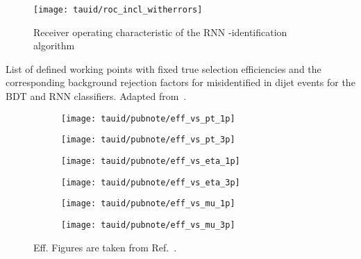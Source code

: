 \begin{figure}[htbp]
  \centering

  \texttt{[image: tauid/roc\_incl\_witherrors]}

  \caption{Receiver operating characteristic of the RNN
    \tauhad-identification algorithm \cite{ATL-PHYS-PUB-2019-033}}%
  \label{fig:tauid_rnn_bdt_roc_comparison}
\end{figure}


\begin{table}
  \centering

  \caption{List of defined working points with fixed true \tauhadvis
    selection efficiencies and the corresponding background rejection
    factors for misidentified \tauhadvis in dijet events for the BDT
    and RNN classifiers. Adapted from~\cite{ATL-PHYS-PUB-2019-033}.}%
  \label{tab:rnn_wps}

  
\end{table}


\begin{figure}[htbp]

  \begin{subfigure}{0.498\textwidth}
    \texttt{[image: tauid/pubnote/eff\_vs\_pt\_1p]}
    \subcaption{}
  \end{subfigure}\hfill%
  \begin{subfigure}{0.498\textwidth}
    \texttt{[image: tauid/pubnote/eff\_vs\_pt\_3p]}
    \subcaption{}
  \end{subfigure}

  \begin{subfigure}{0.498\textwidth}
    \texttt{[image: tauid/pubnote/eff\_vs\_eta\_1p]}
    \subcaption{}
  \end{subfigure}\hfill%
  \begin{subfigure}{0.498\textwidth}
    \texttt{[image: tauid/pubnote/eff\_vs\_eta\_3p]}
    \subcaption{}
  \end{subfigure}

  \begin{subfigure}{0.498\textwidth}
    \texttt{[image: tauid/pubnote/eff\_vs\_mu\_1p]}
    \subcaption{}
  \end{subfigure}\hfill%
  \begin{subfigure}{0.498\textwidth}
    \texttt{[image: tauid/pubnote/eff\_vs\_mu\_3p]}
    \subcaption{}
  \end{subfigure}

  \caption{Eff. Figures are taken from
    Ref.~\cite{ATL-PHYS-PUB-2019-033}.}
  \label{fig:tauid_truetau_eff}
\end{figure}





